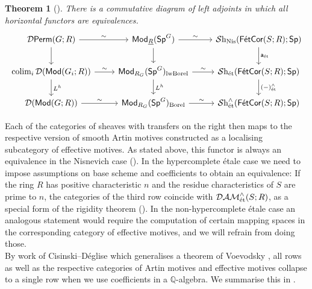 \documentclass[reqno]{amsart}
\numberwithin{equation}{section}\theoremstyle{thms}
\newtheorem*{thm*}{Theorem}
\theoremstyle{defn}
\newcommand{\bQ}{\mathbb{Q}}
\newcommand{\cD}{\mathcal{D}}
\newcommand{\tn}[1]{\textnormal{#1}}
\newcommand{\tsf}[1]{\textsf{\textup{#1}}}
\newcommand{\mcal}[1]{\mathcal{#1}}
\newcommand{\underl}[1]{\underline{#1}}
\newcommand{\sheaves}{\mcal{S}\tn{h}}
\newcommand{\Mod}{\tsf{Mod}}
\newcommand{\spec}{\tsf{Sp}}
\newcommand{\specg}{\tsf{Sp}^G}
\newcommand{\Perm}{\tsf{Perm}}
\newcommand{\corfets}[1]{\tsf{FétCor}(S;#1)}
\begin{document}
\begin{thm*}[]
There is a commutative diagram of left adjoints in which all horizontal functors are equivalences.
\[\begin{tikzcd}
	{\cD\Perm(G;R)} & {\Mod_{\underl{R}}(\specg)} & {\sheaves_{\tn{Nis}}(\corfets{R};\spec)}  \\
	{\tn{colim}_i \, \cD(\Mod(G_i;R))} & {\Mod_{R_G}(\specg)_{\tn{lwBorel}}} & {\sheaves_{\tn{ét}}(\corfets{R};\spec)}  \\
	{\cD(\Mod(G;R))} & {\Mod_{R_G}(\specg)_{\tn{Borel}}} & {\sheaves_{\tn{ét}}^{\wedge}(\corfets{R};\spec)} 
	\arrow["\sim", from=1-1, to=1-2]
	\arrow[from=1-1, to=2-1]
	\arrow["\sim", from=1-2, to=1-3]
	\arrow[from=1-2, to=2-2]
	\arrow["\tsf{a}_{\tn{ét}}", from=1-3, to=2-3]
	\arrow["\sim", from=2-1, to=2-2]
	\arrow["L^h", from=2-1, to=3-1]
	\arrow["\sim", from=2-2, to=2-3]
	\arrow["L^h", from=2-2, to=3-2]
	\arrow["(-)^{\wedge}_\tn{ét}", from=2-3, to=3-3]
	\arrow["\sim", from=3-1, to=3-2]
	\arrow["\sim", from=3-2, to=3-3]
\end{tikzcd}\]
\end{thm*}

\noindent Each of the categories of sheaves with transfers on the right then maps to the respective version of smooth Artin motives constructed as a localising subcategory of effective motives. As stated above, this functor is always an equivalence in the Nisnevich case (). In the hypercomplete étale case we need to impose assumptions on base scheme and coefficients to obtain an equivalence: If the ring $R$ has positive characteristic $n$ and the residue characteristics of $S$ are prime to $n$, the categories of the third row coincide with $\mcal{DAM}_{\tn{ét}}^{\wedge}(S;R)$, as a special form of the rigidity theorem (). In the non-hypercomplete étale case an analogous statement would require the computation of certain mapping spaces in the corresponding category of effective motives, and we will refrain from doing those. \\
By work of Cisinski--Déglise \cite[§2]{cd16} which generalises a theorem of Voevodsky \cite[§5, Theorem 4.1.12]{vsf00}, all rows as well as the respective categories of Artin motives and effective motives collapse to a single row when we use coefficients in a $\bQ$-algebra. We summarise this in . \\
\end{document}
